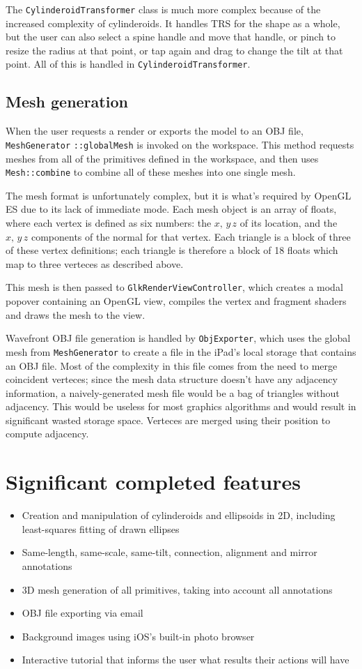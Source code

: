 The \verb#CylinderoidTransformer# class is much more complex because of the
increased complexity of cylinderoids. It handles TRS for the shape as a whole,
but the user can also select a spine handle and move that handle, or pinch to
resize the radius at that point, or tap again and drag to change the tilt at
that point. All of this is handled in \verb#CylinderoidTransformer#.

\subsection{Mesh generation}
When the user requests a render or exports the model to an OBJ file,
\verb#MeshGenerator# \verb#::globalMesh# is invoked on the workspace. This method
requests meshes from all of the primitives defined in the workspace, and then
uses \verb#Mesh::combine# to combine all of these meshes into one single mesh.

The mesh format is unfortunately complex, but it is what's required by OpenGL ES
due to its lack of immediate mode. Each mesh object is an array of floats, where
each vertex is defined as six numbers: the $x,\,y\,z$ of its location, and the
$x,\,y\,z$ components of the normal for that vertex. Each triangle is a block of
three of these vertex definitions; each triangle is therefore a block of 18
floats which map to three verteces as described above.

This mesh is then passed to \verb#GlkRenderViewController#, which creates a
modal popover containing an OpenGL view, compiles the vertex and fragment
shaders and draws the mesh to the view.

Wavefront OBJ file generation is handled by \verb#ObjExporter#, which uses the
global mesh from \verb#MeshGenerator# to create a file in the iPad's local
storage that contains an OBJ file. Most of the complexity in this file comes
from the need to merge coincident verteces; since the mesh data structure
doesn't have any adjacency information, a naively-generated mesh file would be a
bag of triangles without adjacency. This would be useless for most graphics
algorithms and would result in significant wasted storage space. Verteces are
merged using their position to compute adjacency.

\section{Significant completed features}
\begin{itemize}
\item Creation and manipulation of cylinderoids and ellipsoids in 2D, including
least-squares fitting of drawn ellipses
\item Same-length, same-scale, same-tilt, connection, alignment and mirror
annotations
\item 3D mesh generation of all primitives, taking into account all annotations
\item OBJ file exporting via email
\item Background images using iOS's built-in photo browser
\item Interactive tutorial that informs the user what results their actions will
have
\end{itemize}

